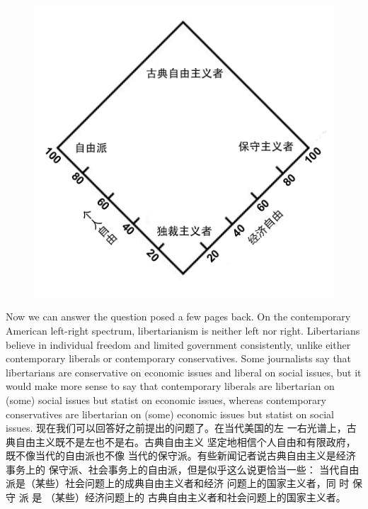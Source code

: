 \begin{paracol}{2}
\begin{figure}[!htb]
\centering
\includegraphics[width=0.7\linewidth]{2}
\end{figure}
\switchcolumn*
Now we can answer the question posed a few pages back. On
the contemporary American left-right spectrum, libertarianism
is neither left nor right. Libertarians believe in individual freedom and limited government consistently, unlike either contemporary liberals or contemporary conservatives. Some
journalists say that libertarians are conservative on economic issues and liberal on social issues, but it would make more sense
to say that contemporary liberals are libertarian on (some) social
issues but statist on economic issues, whereas contemporary conservatives are libertarian on (some) economic issues but statist on social issues.
\switchcolumn
现在我们可以回答好之前提出的问题了。在当代美国的左
一右光谱上，古典自由主义既不是左也不是右。古典自由主义
坚定地相信个人自由和有限政府，既不像当代的自由派也不像
当代的保守派。有些新闻记者说古典自由主义是经济事务上的
保守派、社会事务上的自由派，但是似乎这么说更恰当一些：
当代自由派是（某些）社会问题上的成典自由主义者和经济
问题上的国家主义者，同 时 保 守 派 是 （某些）经济问题上的
古典自由主义者和社会问题上的国家主义者。


\end{paracol}
